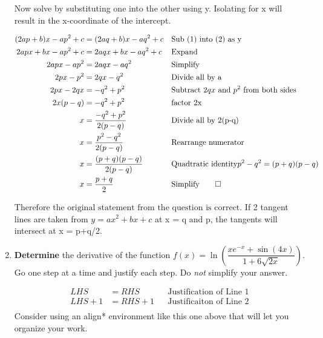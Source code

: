 \documentclass[12pt]{book}
\begin{document}
\begin{enumerate}
Now solve by substituting one into the other using y. Isolating 
for x will result in the x-coordinate of the intercept.

\vspace{-0.3cm}
\addtolength{\jot}{0.3em}
\begin{align*}
    (2ap+b)x - ap^2+c &= (2aq+b)x - aq^2+c && \text{Sub (1) into (2) as y} \\
    2apx+bx - ap^2+c &= 2aqx+bx - aq^2+c && \text{Expand} \\
    2apx - ap^2 &= 2aqx - aq^2 && \text{Simplify} \\
    2px - p^2 &= 2qx - q^2 && \text{Divide all by a} \\
    2px - 2qx &=  - q^2 + p^2 && \text{Subtract } 2qx \text{ and } p^2 \text{ from both sides} \\
    2x(p-q) &=  - q^2 + p^2 && \text{factor 2x} \\
    x &=  \dfrac{- q^2 + p^2}{2(p-q)} && \text{Divide all by 2(p-q)} \\
    x &=  \dfrac{p^2 - q^2}{2(p-q)} && \text{Rearrange numerator} \\
    x &=  \dfrac{(p+q)(p-q)}{2(p-q)} &&  \text{Quadtratic identity} p^2 - q^2 = (p+q)(p-q)\\
    x &=  \dfrac{p+q}{2} &&  \text{Simplify} \qed\\
\end{align*}

\vspace{-1cm}

$\boxed{\text{Therefore the original statement from the question is correct.}}$
If 2 tangent lines are taken from $y=ax^2+bx+c$ at x = q and p, 
the tangents will intersect at x =  p+q/2.
 
\vspace{0.3cm}


\newpage


\item \textbf{Determine} the derivative of the function $f(x) = \ln\left( \dfrac{xe^{-x} + \sin(4x)}{1 + 6\sqrt{2x}} \right)$. Go one step at a time and justify each step. Do \emph{not} simplify your answer.



\begin{align*}
LHS &= RHS && \text{Justification of Line 1}\\
LHS + 1 &= RHS + 1 && \text{Justificaiton of Line 2}\\
\end{align*}
Consider using an align* environment like this one above that will let you organize your work.


\end{enumerate}
\end{document}
